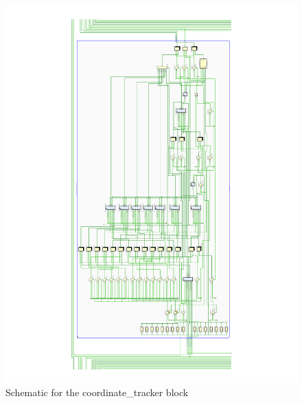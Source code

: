     \begin{figure}[H]
        \centering
        \includegraphics[width=\textwidth]{annexes/complete_synthesis.pdf}
        \caption{Schematic for the coordinate\_tracker block}
        \label{anx:complete_synthesis}
    \end{figure}
\label{page:count_last_page}
